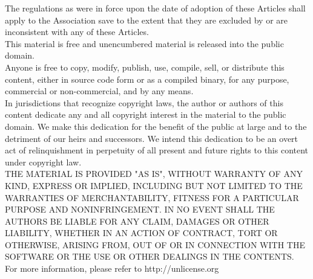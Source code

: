 \documentclass[english,a4paper,titlepage,oneside]{article}
\begin{document}
\begin{titlepage}
  The regulations as were in force upon the date of adoption of these Articles shall apply to the Association save to the extent that they are excluded by or are inconsistent with any of these Articles.
  \linebreak[1]
  \\This material is free and unencumbered material is released into the public domain.
  \linebreak[1]
  \\Anyone is free to copy, modify, publish, use, compile, sell, or
  distribute this content, either in source code form or as a compiled
  binary, for any purpose, commercial or non-commercial, and by any
  means.
  \linebreak[1]
  \\In jurisdictions that recognize copyright laws, the author or authors
  of this content dedicate any and all copyright interest in the
  material to the public domain. We make this dedication for the benefit
  of the public at large and to the detriment of our heirs and
  successors. We intend this dedication to be an overt act of
  relinquishment in perpetuity of all present and future rights to this
  content under copyright law.
  \linebreak[1]
  \\THE MATERIAL IS PROVIDED "AS IS", WITHOUT WARRANTY OF ANY KIND,
  EXPRESS OR IMPLIED, INCLUDING BUT NOT LIMITED TO THE WARRANTIES OF
  MERCHANTABILITY, FITNESS FOR A PARTICULAR PURPOSE AND NONINFRINGEMENT.
  IN NO EVENT SHALL THE AUTHORS BE LIABLE FOR ANY CLAIM, DAMAGES OR
  OTHER LIABILITY, WHETHER IN AN ACTION OF CONTRACT, TORT OR OTHERWISE,
  ARISING FROM, OUT OF OR IN CONNECTION WITH THE SOFTWARE OR THE USE OR
  OTHER DEALINGS IN THE CONTENTS.
  \linebreak[1]
  \\For more information, please refer to \<http://unlicense.org\>

\end{titlepage}


\end{document}
